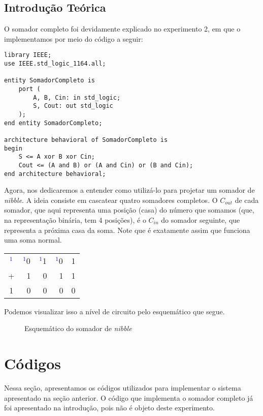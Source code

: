 \documentclass[a4paper,12pt]{article}
\newenvironment{code}{\captionsetup{type=listing}}{}
\begin{document}
\subsection{Introdução Teórica}
O somador completo foi devidamente explicado no experimento 2, em que o implementamos por meio do código a seguir:
\begin{code}
    \begin{verbatim}
library IEEE;
use IEEE.std_logic_1164.all;

entity SomadorCompleto is
    port (
        A, B, Cin: in std_logic;
        S, Cout: out std_logic
    );
end entity SomadorCompleto;

architecture behavioral of SomadorCompleto is
begin
    S <= A xor B xor Cin;
    Cout <= (A and B) or (A and Cin) or (B and Cin);
end architecture behavioral;
    \end{verbatim}
    \caption{Implementação do somador completo em VHDL}
    \label{cod: somadorCompleto}
\end{code}
\newpage
Agora, nos dedicaremos a entender como utilizá-lo para projetar um somador de \textit{nibble}. A ideia consiste em cascatear quatro somadores completos. O $C_{out}$ de cada somador, que aqui representa uma posição (casa) do número que somamos (que, na representação binária, tem 4 posições), é o $C_{in}$ do somador seguinte, que representa a próxima casa da soma. Note que é exatamente assim que funciona uma soma normal.
\begin{table}[H]
    \centering
    \begin{tabular}{c c c c c}
         \textcolor{blue}{$^1$} & \textcolor{blue}{$^1$}0 & \textcolor{blue}{$^1$}1 & \textcolor{blue}{$^1$}0 & 1  \\
         + & \ 1 & \ 0 & \ 1 & 1 \\
         \hline
         1 & \ 0 & \ 0 & \ 0 & 0 \\
    \end{tabular}
    \label{tab:my_label}
    \vspace{-20pt}
\end{table}
\noindent Podemos visualizar isso a nível de circuito pelo esquemático que segue.

\begin{figure}[H]
    \centering
    
    \caption{Esquemático do somador de \textit{nibble}}
    \label{fig:enter-label}
\end{figure}


\section{Códigos} \label{sec: codigos}
Nessa seção, apresentamos os códigos utilizados para implementar o sistema apresentado na seção anterior. O código que implementa o somador completo já foi apresentado na introdução, pois não é objeto deste experimento.
\end{document}
